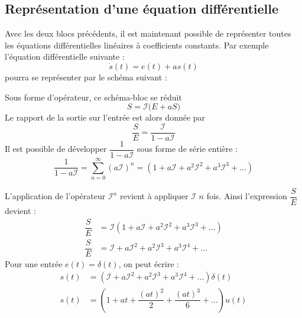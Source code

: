 \subsection{Représentation d'une équation différentielle}
Avec les deux blocs précédents, il est maintenant possible de représenter 
toutes les équations différentielles linéaires à coefficients constants.
Par exemple l'équation différentielle suivante :
\[
    \dot{s}(t)=e(t)+as(t)
\]
pourra se représenter par le schéma suivant : 
\begin{center}
    
\end{center}
Sous forme d'opérateur, ce schéma-bloc se réduit
\[
    S=\mathcal{I}\big(E+aS\big)
\]
Le rapport de la sortie sur l'entrée est alors donnée par 
\[
    \dfrac{S}{E}=\dfrac{\mathcal{I}}{1-a\mathcal{I}}
\]
Il est possible de développer $\dfrac{1}{1-a\mathcal{I}}$ sous forme de 
série entière :
\[
    \dfrac{1}{1-a\mathcal{I}}=\sum_{n=0}^{\infty}(a\mathcal{I})^n
                             =(1+a\mathcal{I}
                                +a^2\mathcal{I}^2
                                +a^3\mathcal{I}^3+\ldots)
\]
\clearpage

\captionsetup{width=0.9\linewidth}
L'application de l'opérateur $\mathcal{I}^n$ revient à 
appliquer $\mathcal{I}$ $n$ fois.
Ainsi l'expression $\dfrac{S}{E}$ devient :
\begin{align*}
    \dfrac{S}{E}&=\mathcal{I}\left(1+a\mathcal{I}
                                   +a^2\mathcal{I}^2
                                   +a^3\mathcal{I}^3+\ldots\right)\\
    \dfrac{S}{E}&=\mathcal{I}+a\mathcal{I}^2
                            +a^2\mathcal{I}^3
                            +a^3\mathcal{I}^4+\ldots
\end{align*}
Pour une entrée $e(t)=\delta(t)$, on peut écrire :
\begin{align*}
    s(t)&=\left(\mathcal{I}+a\mathcal{I}^2
                          +a^2\mathcal{I}^3
                          +a^3\mathcal{I}^4+\ldots\right)\delta(t)\\
    s(t)&=(1+at+\dfrac{(at)^2}{2}+\dfrac{(at)^3}{6}+\ldots)u(t)
\end{align*}
